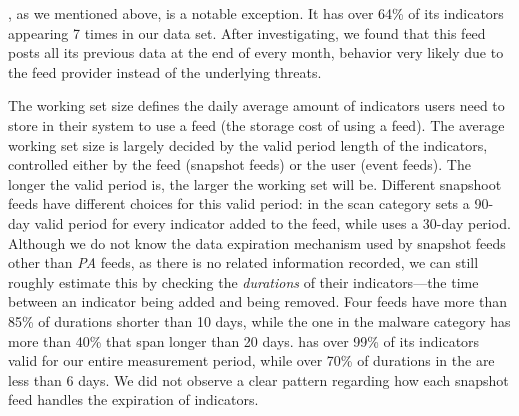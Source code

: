 \feednothink, as we mentioned above, is a notable exception. It has over 64\% of its
indicators appearing 7 times in our data set. After investigating, we
found that this feed posts all its previous data at the end of every month, behavior very likely
due to the feed provider instead of the underlying threats.

The working set size defines the daily average amount of indicators users need to store in their
system to use a feed (the storage cost of using a feed). The average
working set size is largely decided by the valid period length
of the indicators, controlled either
by the feed (snapshot feeds) or the user (event feeds). The longer the valid period is,
the larger the working set will be. Different snapshoot feeds have different choices for this
valid period: {\feedTSAlienVault} in the scan category sets a 90-day valid period for
every indicator added to the feed, while {\feedTSAbusech} uses a 30-day period. Although we do not
know the data expiration mechanism used by snapshot feeds other than \emph{PA} feeds, as
there is no related information recorded, we can still roughly estimate this by checking the
\emph{durations} of their indicators---the time between an indicator being added and being removed.
Four {\feedetiprep} feeds have more than 85\% of durations shorter than 10 days, while the one in
the malware category has more than 40\% that span longer than 20 days. {\feedfeodo} has over 99\% of
its indicators valid for our entire measurement period, while over 70\% of durations in the
{\feedzeus} are less than 6 days. We did not observe a clear pattern regarding how each snapshot
feed handles the expiration of indicators.


